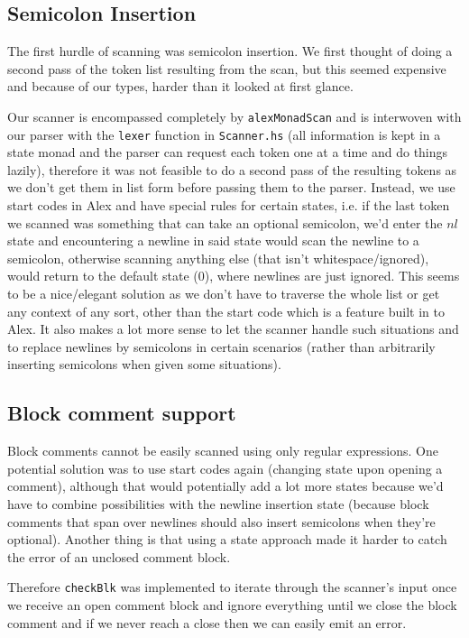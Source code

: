 \documentclass[11pt]{article}
\begin{document}
\subsection{Semicolon Insertion}
\label{sec:orge8a0062}
The first hurdle of scanning was semicolon insertion. We first
thought of doing a second pass of the token list resulting from the
scan, but this seemed expensive and because of our types, harder
than it looked at first glance.

Our scanner is encompassed completely by \texttt{alexMonadScan}
and is interwoven with our parser with the \texttt{lexer} function in
\texttt{Scanner.hs} (all information is kept in a state monad and the
parser can request each token one at a time and do things lazily),
therefore it was not feasible to do a second pass of the resulting tokens as
we don't get them in list form before passing them to the
parser. Instead, we use start codes in Alex and have
special rules for certain states, i.e. if the last token we scanned
was something that can take an optional semicolon, we'd enter the
\(nl\) state and encountering a newline in said state would scan the
newline to a semicolon, otherwise scanning anything else (that
isn't whitespace/ignored), would return to the default state (\(0\)),
where newlines are just ignored. This seems to be a nice/elegant
solution as we don't have to traverse the whole list or get any
context of any sort, other than the start code which is a feature
built in to Alex. It also makes a lot more sense to let the scanner
handle such situations and to replace newlines by semicolons in
certain scenarios (rather than arbitrarily inserting semicolons
when given some situations).
\subsection{Block comment support}
\label{sec:orgb3ae4ad}
Block comments cannot be easily scanned using only regular
expressions. One potential solution was to use start codes again
(changing state upon opening a comment), although that would
potentially add a lot more states because we'd have to combine
possibilities with the newline insertion state (because block
comments that span over newlines should also insert semicolons when
they're optional). Another thing is that using a state approach
made it harder to catch the error of an unclosed comment block.

Therefore \texttt{checkBlk} was implemented to iterate through the
scanner's input once we receive an open comment block and ignore
everything until we close the block comment and if we never reach a
close then we can easily emit an error.
\end{document}
